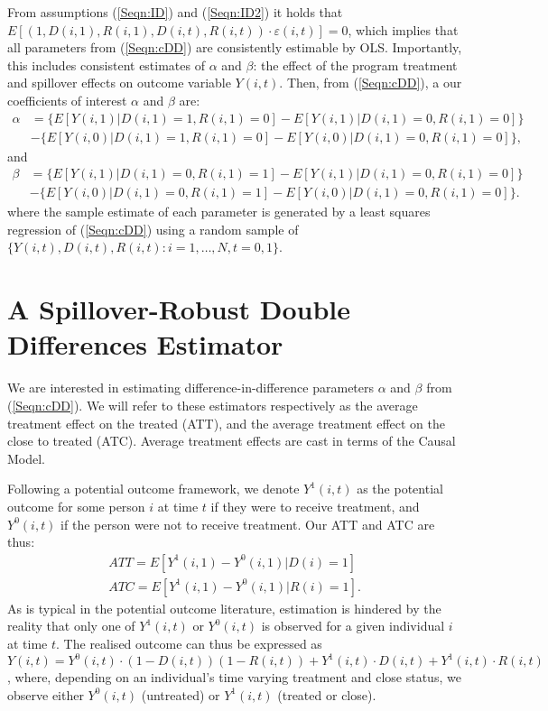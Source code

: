 \documentclass{article}
\begin{document}
\begin{spacing}{1.1}
From assumptions (\ref{Seqn:ID}) and (\ref{Seqn:ID2}) it holds that $E[(1,D(i,1),R(i,1),
D(i,t),R(i,t))\cdot\varepsilon(i,t)]=0$, which implies that all parameters from
(\ref{Seqn:cDD}) are consistently estimable by OLS.  Importantly, this includes
consistent estimates of $\alpha$ and $\beta$: the effect of the program treatment 
and spillover effects on outcome variable $Y(i,t)$.  Then, from (\ref{Seqn:cDD}),
a our coefficients of interest $\alpha$ and $\beta$ are:
\begin{equation}
\label{Seqn:DDa}
\begin{split}
\alpha&=\{E[Y(i,1)|D(i,1)=1,R(i,1)=0]-E[Y(i,1)|D(i,1)=0,R(i,1)=0]\} \\
      &-\{E[Y(i,0)|D(i,1)=1,R(i,1)=0]-E[Y(i,0)|D(i,1)=0,R(i,1)=0]\}, 
\end{split}
\end{equation}
and 
\begin{equation}
\label{Seqn:DDb}
\begin{split}
\beta&=\{E[Y(i,1)|D(i,1)=0,R(i,1)=1]-E[Y(i,1)|D(i,1)=0,R(i,1)=0]\} \\
      &-\{E[Y(i,0)|D(i,1)=0,R(i,1)=1]-E[Y(i,0)|D(i,1)=0,R(i,1)=0]\}. 
\end{split}
\end{equation}
where the sample estimate of each parameter is generated by a least squares
regression of (\ref{Seqn:cDD}) using a random sample of 
$\{Y(i,t), D(i,t), R(i,t): i=1, \ldots, N, t=0, 1\}$.

\section{A Spillover-Robust Double Differences Estimator}
We are interested in estimating difference-in-difference parameters $\alpha$ and 
$\beta$ from (\ref{Seqn:cDD}).  We will refer to these estimators respectively
as the average treatment effect on the treated (ATT), and the average treatment
effect on the close to treated (ATC).  Average treatment effects are cast in 
terms of the \citet{Rubin1974} Causal Model.

Following a potential outcome framework, we denote $Y^1(i,t)$ as the potential
outcome for some person $i$ at time $t$ if they were to receive treatment, and
$Y^0(i,t)$ if the person were not to receive treatment.  Our ATT and ATC are
thus:
\begin{eqnarray}
\label{Seqn:estim}
ATT=E[Y^1(i,1)-Y^0(i,1)|D(i)=1]\  \\
ATC=E[Y^1(i,1)-Y^0(i,1)|R(i)=1].
\end{eqnarray}
As is typical in the potential outcome literature, estimation is hindered by the
reality that only one of $Y^1(i,t)$ or $Y^0(i,t)$ is observed for a given 
individual $i$ at time $t$.  The realised outcome can thus be expressed as 
$Y(i,t)=Y^0(i,t)\cdot (1-D(i,t))(1-R(i,t))+Y^1(i,t)\cdot D(i,t)+Y^1(i,t)\cdot 
R(i,t)$, where, depending on an individual's time varying treatment and close
status, we observe either $Y^0(i,t)$ (untreated) or $Y^1(i,t)$ (treated or 
close).


\end{spacing}
\end{document}
